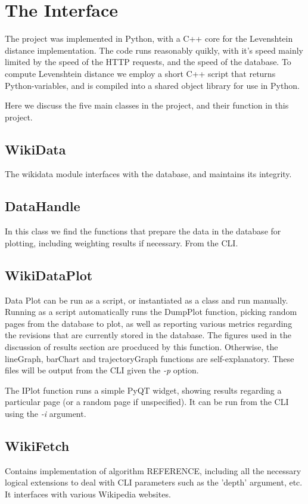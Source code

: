 \section{The Interface}
The project was implemented in Python, with a C++ core for the
Levenshtein distance implementation. The code runs reasonably quikly,
with it's speed mainly limited by the speed of the HTTP requests, and
the speed of the database. To compute Levenshtein distance we employ a
short C++ script that returns Python-variables, and is compiled into a
shared object library for use in Python. 

Here we discuss the five main classes in the project, and their
function in this project.

\subsection*{WikiData}
The wikidata module interfaces with the database, and maintains its
integrity. 

\subsection*{DataHandle}
In this class we find the functions that prepare the data in the
database for plotting, including weighting results if necessary. From
the CLI. 

\subsection*{WikiDataPlot}
Data Plot can be run as a script, or instantiated as a class and run
manually. Running as a script automatically runs the DumpPlot
function, picking random pages from the database to plot, as well as
reporting various metrics regarding the revisions that are currently
stored in the database. The figures used in the discussion of results
section are procduced by this function. Otherwise, the lineGraph,
barChart and trajectoryGraph functions are self-explanatory. These
files will be output from the CLI given the \textit{-p} option.

The IPlot function runs a simple PyQT widget, showing results regarding a
particular page (or a random page if unspecified). It can be run from
the CLI using the \textit{-i} argument.

\subsection*{WikiFetch}
Contains implementation of algorithm REFERENCE, including all the
necessary logical extensions to deal with CLI parameters such as the
'depth' argument, etc. It interfaces with various Wikipedia websites. 

